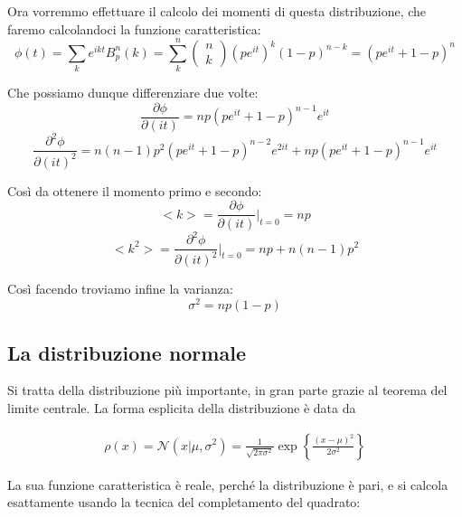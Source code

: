 \documentclass{report}
\begin{document}
Ora vorremmo effettuare il calcolo dei momenti di questa distribuzione, che faremo calcolandoci la funzione caratteristica: 
\begin{equation}
    \phi(t) = \sum_k e^{ikt}B_p^n(k) = \sum_k^n \begin{pmatrix}
        n \\ k
    \end{pmatrix} (pe^{it})^k (1-p)^{n-k} = (pe^{it} +1 -p)^n
\end{equation}

Che possiamo dunque differenziare due volte: 
\begin{equation}
    \frac{\partial \phi}{\partial(it)} = np(pe^{it} + 1 -p)^{n-1}e^{it}
\end{equation}
\begin{equation}
    \frac{\partial^2 \phi}{\partial(it)^2} = n(n-1)p^2(pe^{it} + 1 -p)^{n-2}e^{2it} +  np(pe^{it} + 1 -p)^{n-1}e^{it}
\end{equation}

Così da ottenere il momento primo e secondo: 
\begin{equation}
    <k> = \frac{\partial \phi}{\partial(it)}\biggr|_{t=0} = np 
\end{equation}
\begin{equation}
    <k^2> = \frac{\partial^2 \phi}{\partial(it)^2}\biggr|_{t=0} = np + n(n-1)p^2 
\end{equation}

Così facendo troviamo infine la varianza: 
\begin{equation}
    \sigma^2 = np(1-p)
\end{equation}

\subsection{La distribuzione normale}

Si tratta della distribuzione più importante, in gran parte grazie al teorema del limite centrale. La forma esplicita della distribuzione è data da 

\begin{align}
    \rho(x) = \mathcal{N}(x|\mu, \sigma^2 ) = \frac{1}{\sqrt{2\pi\sigma^2}}\exp\left\{\frac{(x-\mu)^2}{2\sigma^2} \right\}
\end{align}

La sua funzione caratteristica è reale, perché la distribuzione è pari, e si calcola esattamente usando la tecnica del completamento del quadrato: 
\end{document}
